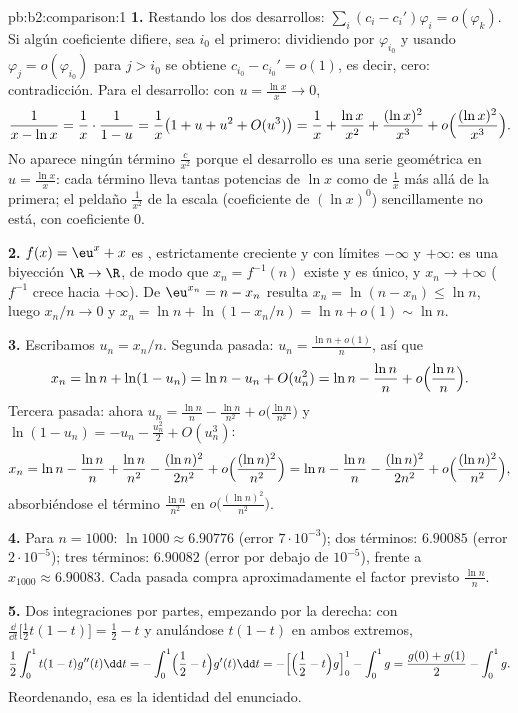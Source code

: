 \begin{solution}{pb:b2:comparison:1}
\textbf{1.} Restando los dos desarrollos: $\sum_i (c_i -
c_i')\varphi_i = o(\varphi_k)$. Si algún coeficiente difiere, sea
$i_0$ el primero: dividiendo por $\varphi_{i_0}$ y usando
$\varphi_j = o(\varphi_{i_0})$ para $j > i_0$ se obtiene $c_{i_0}
- c_{i_0}' = o(1)$, es decir, cero: contradicción. Para el
desarrollo: con $u = \frac{\ln x}x \to 0$,
\[
\frac{1}{x - \ln x} = \frac1x\cdot\frac{1}{1 - u}
= \frac1x\bigl(1 + u + u^2 + O(u^3)\bigr)
= \frac1x + \frac{\ln x}{x^2} + \frac{(\ln x)^2}{x^3} +
o\Bigl(\frac{(\ln x)^2}{x^3}\Bigr).
\]
No aparece ningún término $\frac c{x^2}$ porque el desarrollo es
una serie geométrica en $u = \frac{\ln x}{x}$: cada término lleva
tantas potencias de $\ln x$ como de $\frac1x$ más allá de la
primera; el peldaño $\frac1{x^2}$ de la escala (coeficiente de
$(\ln x)^0$) sencillamente no está, con coeficiente $0$.

\textbf{2.} $f(x) = \eu^x + x$ es , estrictamente
creciente y con límites $-\infty$ y $+\infty$: es una biyección
$\R \to \R$, de modo que $x_n = f^{-1}(n)$ existe y es único, y
$x_n \to +\infty$ ($f^{-1}$ crece hacia $+\infty$). De
$\eu^{x_n} = n - x_n$ resulta $x_n = \ln(n - x_n) \leq \ln n$,
luego $x_n/n \to 0$ y $x_n = \ln n + \ln(1 - x_n/n) = \ln n +
o(1) \sim \ln n$.

\textbf{3.} Escribamos $u_n = x_n/n$. Segunda pasada: $u_n =
\frac{\ln n + o(1)}{n}$, así que
\[
x_n = \ln n + \ln(1 - u_n) = \ln n - u_n + O(u_n^2)
= \ln n - \frac{\ln n}{n} + o\Bigl(\frac{\ln n}n\Bigr).
\]
Tercera pasada: ahora $u_n = \frac{\ln n}{n} - \frac{\ln n}{n^2} +
o\bigl(\frac{\ln n}{n^2}\bigr)$ y $\ln(1 - u_n) = -u_n -
\frac{u_n^2}2 + O(u_n^3)$:
\[
x_n = \ln n - \frac{\ln n}n + \frac{\ln n}{n^2}
- \frac{(\ln n)^2}{2n^2} + o\Bigl(\frac{(\ln
n)^2}{n^2}\Bigr)
= \ln n - \frac{\ln n}{n} - \frac{(\ln n)^2}{2n^2} +
o\Bigl(\frac{(\ln n)^2}{n^2}\Bigr),
\]
absorbiéndose el término $\frac{\ln n}{n^2}$ en
$o\bigl(\frac{(\ln n)^2}{n^2}\bigr)$.

\textbf{4.} Para $n = 1000$: $\ln 1000 \approx 6.90776$ (error
$7\cdot10^{-3}$); dos términos: $6.90085$ (error
$2\cdot10^{-5}$); tres términos: $6.90082$ (error por debajo de
$10^{-5}$), frente a $x_{1000} \approx 6.90083$. Cada pasada
compra aproximadamente el factor previsto $\frac{\ln n}{n}$.

\textbf{5.} Dos integraciones por partes, empezando por la
derecha: con $\frac{\dd}{\dd t}\bigl[\tfrac12t(1-t)\bigr] =
\tfrac12 - t$ y anulándose $t(1-t)$ en ambos extremos,
\[
\frac12\int_0^1 t(1-t)g''(t)\dd t
= -\int_0^1\Bigl(\frac12 - t\Bigr)g'(t)\dd t
= -\Bigl[\Bigl(\frac12 - t\Bigr)g\Bigr]_0^1 - \int_0^1 g
= \frac{g(0) + g(1)}2 - \int_0^1 g .
\]
Reordenando, esa es la identidad del enunciado.


\end{solution}
